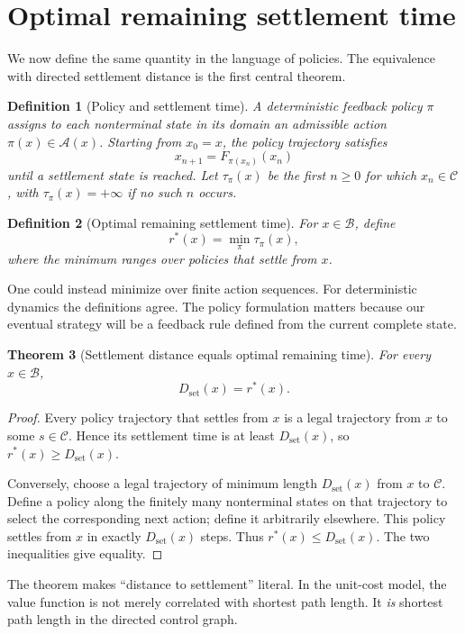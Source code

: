 \documentclass[11pt,letterpaper]{article}
\newtheorem{theorem}{Theorem}[section]
\newtheorem{definition}[theorem]{Definition}
\theoremstyle{remark}
\newcommand{\Cset}{\mathcal C}
\newcommand{\Basin}{\mathcal B}
\newcommand{\A}{\mathcal A}
\newcommand{\rstar}{r^{\!*}}
\newcommand{\dset}{D_{\mathrm{set}}}
\begin{document}
\section{Optimal remaining settlement time}\label{sec:bellman}

We now define the same quantity in the language of policies. The equivalence with directed settlement distance is the first central theorem.

\begin{definition}[Policy and settlement time]
A deterministic feedback policy $\pi$ assigns to each nonterminal state in its domain an admissible action $\pi(x)\in\A(x)$. Starting from $x_0=x$, the policy trajectory satisfies
\[
x_{n+1}=F_{\pi(x_n)}(x_n)
\]
until a settlement state is reached. Let $\tau_\pi(x)$ be the first $n\ge0$ for which $x_n\in\Cset$, with $\tau_\pi(x)=+\infty$ if no such $n$ occurs.
\end{definition}

\begin{definition}[Optimal remaining settlement time]
For $x\in\Basin$, define
\[
\rstar(x)=\min_{\pi}\tau_\pi(x),
\]
where the minimum ranges over policies that settle from $x$.
\end{definition}

One could instead minimize over finite action sequences. For deterministic dynamics the definitions agree. The policy formulation matters because our eventual strategy will be a feedback rule defined from the current complete state.

\begin{theorem}[Settlement distance equals optimal remaining time]\label{thm:distanceequals}
For every $x\in\Basin$,
\[
\boxed{\dset(x)=\rstar(x).}
\]
\end{theorem}

\begin{proof}
Every policy trajectory that settles from $x$ is a legal trajectory from $x$ to some $s\in\Cset$. Hence its settlement time is at least $\dset(x)$, so $\rstar(x)\ge\dset(x)$.

Conversely, choose a legal trajectory of minimum length $\dset(x)$ from $x$ to $\Cset$. Define a policy along the finitely many nonterminal states on that trajectory to select the corresponding next action; define it arbitrarily elsewhere. This policy settles from $x$ in exactly $\dset(x)$ steps. Thus $\rstar(x)\le\dset(x)$. The two inequalities give equality.
\end{proof}

The theorem makes ``distance to settlement'' literal. In the unit-cost model, the value function is not merely correlated with shortest path length. It \emph{is} shortest path length in the directed control graph.
\end{document}
